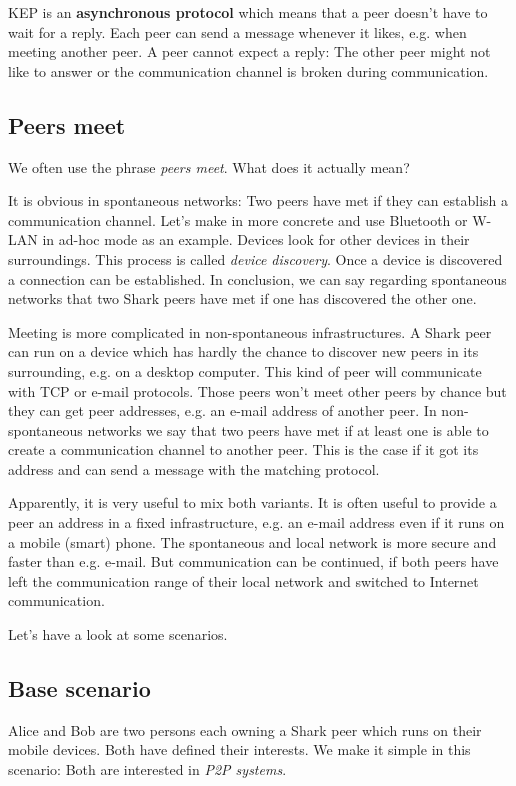 KEP is an {\bf asynchronous protocol} which means that a peer doesn't have to wait for a reply. Each peer can send a message whenever it likes, e.g. when meeting another peer. A peer cannot expect a reply: The other peer might not like to answer or the communication channel is broken during communication.

\subsection{Peers meet}
We often use the phrase {\it peers meet}. What does it actually mean?

It is obvious in spontaneous networks: Two peers have met if they can establish a communication channel. Let's make in more concrete and use Bluetooth or W-LAN in ad-hoc mode as an example. Devices look for other devices in their surroundings.
This process is called {\it device discovery}. Once a device is discovered a connection can be established. In conclusion, we can say regarding spontaneous networks that two Shark peers have met if one has discovered the other one.

Meeting is more complicated in non-spontaneous infrastructures. A Shark peer can run on a device which has hardly the chance to discover new peers in its surrounding, e.g. on a desktop computer. This kind of peer will communicate with TCP or e-mail protocols. Those peers won't meet other peers by chance but they can get peer addresses, e.g. an e-mail address of another peer. In non-spontaneous networks we say that two peers have met if at least one is able to create a communication channel to another peer. This is the case if it got its address and can send a message with the matching protocol.

Apparently, it is very useful to mix both variants. It is often useful to provide a peer an address in a fixed infrastructure, e.g. an e-mail address even if it runs on a mobile (smart) phone. The spontaneous and local network is more secure and faster than e.g. e-mail. But communication can be continued, if both peers have left the communication range of their local network and switched to Internet communication.

Let's have a look at some scenarios.

\subsection{Base scenario}
\label{sec:concepts:baseScenario}
Alice and Bob are two persons each owning a Shark peer which runs on their mobile devices. Both have defined their interests. We make it simple in this scenario:
Both are interested in {\it P2P systems}.

